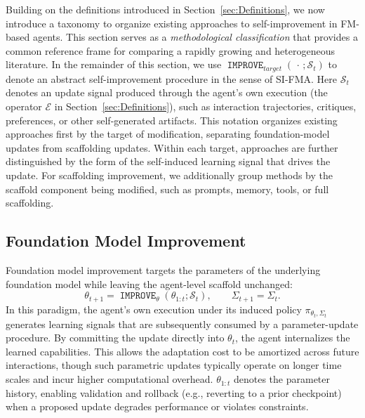\documentclass{article}
\newcommand{\IMPROVE}{\operatorname{\mathtt{IMPROVE}}}
\begin{document}
Building on the definitions introduced in
Section~\ref{sec:Definitions}, we now introduce a taxonomy to organize existing approaches to self-improvement in FM-based agents. This section serves as a \emph{methodological classification} that provides a common reference frame for comparing a rapidly growing and heterogeneous literature. In the remainder of this section, we use $\IMPROVE_{target}(\,\cdot\,;\mathcal{S}_t)$ to denote an abstract self-improvement procedure in the sense of SI-FMA. Here $\mathcal{S}_t$ denotes an update signal produced through the agent’s own execution (the operator $\mathcal{E}$ in Section~\ref{sec:Definitions}), such as interaction trajectories, critiques, preferences, or other self-generated artifacts. This notation organizes existing approaches first by the target of modification, separating foundation-model updates from scaffolding updates. Within each target, approaches are further distinguished by the form of the self-induced learning signal that drives the update. For scaffolding improvement, we additionally group methods by the scaffold component being modified, such as prompts, memory, tools, or full scaffolding.

\subsection{Foundation Model Improvement}
\label{subsec:Foundation_Model_Improvement_(The_Parametric_Slow_Loop)}

Foundation model improvement targets the parameters of the underlying foundation model while leaving the agent-level scaffold unchanged:
\begin{equation}
    \theta_{t+1} = \IMPROVE_{\theta}(\theta_{1:t}; \mathcal{S}_{t}),
    \qquad
    \Sigma_{t+1} = \Sigma_{t}.
\end{equation}
In this paradigm, the agent’s own execution under its induced policy $\pi_{\theta_t,\Sigma_t}$ generates learning signals that are subsequently consumed by a parameter-update procedure. By committing the update directly into $\theta_t$, the agent internalizes the learned capabilities. This allows the adaptation cost to be amortized across future interactions, though such parametric updates typically operate on longer time scales and incur higher computational overhead. $\theta_{1:t}$ denotes the parameter history, enabling validation and rollback (e.g., reverting to a prior checkpoint) when a proposed update degrades performance or violates constraints.
\end{document}
